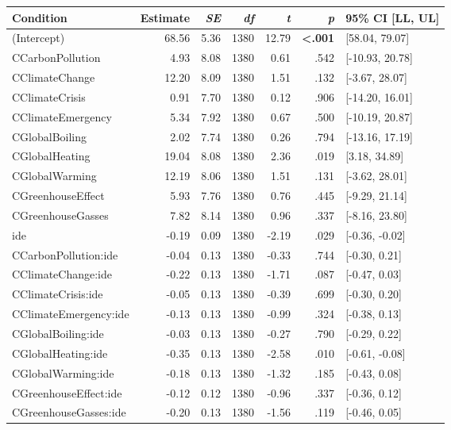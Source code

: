 \begin{table}[ht]
\centering
\begin{tabular}{lrrrrrl}
  \hline
Condition & Estimate & \textit{SE} & \textit{df} & \textit{t} & \textit{p} & 95\% CI [LL, UL] \\ 
  \hline
(Intercept) & 68.56 & 5.36 & 1380 & 12.79 & \textbf{\textless  .001} & [58.04, 79.07] \\ 
  CCarbonPollution & 4.93 & 8.08 & 1380 & 0.61 & .542 & [-10.93, 20.78] \\ 
  CClimateChange & 12.20 & 8.09 & 1380 & 1.51 & .132 & [-3.67, 28.07] \\ 
  CClimateCrisis & 0.91 & 7.70 & 1380 & 0.12 & .906 & [-14.20, 16.01] \\ 
  CClimateEmergency & 5.34 & 7.92 & 1380 & 0.67 & .500 & [-10.19, 20.87] \\ 
  CGlobalBoiling & 2.02 & 7.74 & 1380 & 0.26 & .794 & [-13.16, 17.19] \\ 
  CGlobalHeating & 19.04 & 8.08 & 1380 & 2.36 & .019 & [3.18, 34.89] \\ 
  CGlobalWarming & 12.19 & 8.06 & 1380 & 1.51 & .131 & [-3.62, 28.01] \\ 
  CGreenhouseEffect & 5.93 & 7.76 & 1380 & 0.76 & .445 & [-9.29, 21.14] \\ 
  CGreenhouseGasses & 7.82 & 8.14 & 1380 & 0.96 & .337 & [-8.16, 23.80] \\ 
  ide & -0.19 & 0.09 & 1380 & -2.19 & .029 & [-0.36, -0.02] \\ 
  CCarbonPollution:ide & -0.04 & 0.13 & 1380 & -0.33 & .744 & [-0.30, 0.21] \\ 
  CClimateChange:ide & -0.22 & 0.13 & 1380 & -1.71 & .087 & [-0.47, 0.03] \\ 
  CClimateCrisis:ide & -0.05 & 0.13 & 1380 & -0.39 & .699 & [-0.30, 0.20] \\ 
  CClimateEmergency:ide & -0.13 & 0.13 & 1380 & -0.99 & .324 & [-0.38, 0.13] \\ 
  CGlobalBoiling:ide & -0.03 & 0.13 & 1380 & -0.27 & .790 & [-0.29, 0.22] \\ 
  CGlobalHeating:ide & -0.35 & 0.13 & 1380 & -2.58 & .010 & [-0.61, -0.08] \\ 
  CGlobalWarming:ide & -0.18 & 0.13 & 1380 & -1.32 & .185 & [-0.43, 0.08] \\ 
  CGreenhouseEffect:ide & -0.12 & 0.12 & 1380 & -0.96 & .337 & [-0.36, 0.12] \\ 
  CGreenhouseGasses:ide & -0.20 & 0.13 & 1380 & -1.56 & .119 & [-0.46, 0.05] \\ 
   \hline
\end{tabular}
\end{table}
